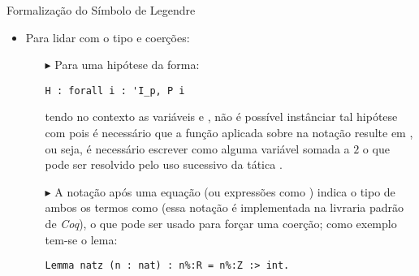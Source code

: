 \begin{frame}[fragile]{Formalização do Símbolo de Legendre}
    \begin{itemize}
        \item Para lidar com o tipo  e coerções:
            \begin{itemize}
                \item[$\blacktriangleright$] Para uma hipótese da forma:
                    \begin{lstlisting}[language=coq,frame=single,tabsize=1]
H : forall i : 'I_p, P i
                    \end{lstlisting}
                tendo no contexto as variáveis  e , não é possível instânciar tal hipótese com  pois é necessário que a 
                função aplicada sobre  na notação resulte em , ou seja, é necessário escrever  como alguma variável somada a $2$ o que pode ser resolvido pelo uso sucessivo da tática . 
                \item[]
                \item[{$\blacktriangleright$}] A notação  após uma equação (ou expressões como \coqinline[]{<>}) indica o tipo de ambos os termos como  (essa notação é implementada na livraria padrão de \textit{Coq}), o que pode ser usado para forçar uma coerção; como exemplo tem-se o lema:
                    \begin{lstlisting}[language=coq,frame=single,tabsize=1]
Lemma natz (n : nat) : n%:R = n%:Z :> int.
                    \end{lstlisting}
                

            \end{itemize}
            
    \end{itemize}
\end{frame}